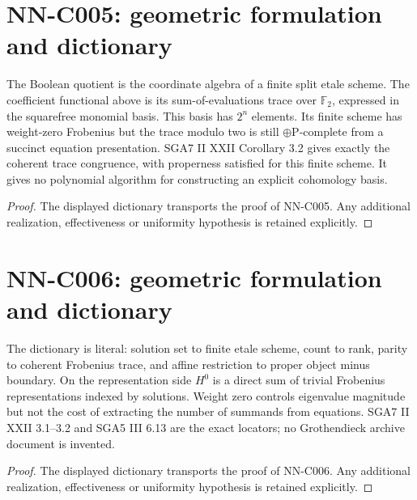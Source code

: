\section{NN-C005: geometric formulation and dictionary}
\begin{geometricstatement}[NN-C005]
The Boolean quotient is the coordinate algebra of a finite split etale scheme. The coefficient functional above is its sum-of-evaluations trace over $\mathbb F_2$, expressed in the squarefree monomial basis. This basis has $2^n$ elements. Its finite scheme has weight-zero Frobenius but the trace modulo two is still $\oplus\mathrm P$-complete from a succinct equation presentation. SGA7 II XXII Corollary 3.2 gives exactly the coherent trace congruence, with properness satisfied for this finite scheme. It gives no polynomial algorithm for constructing an explicit cohomology basis.
\end{geometricstatement}
\begin{proof} The displayed dictionary transports the proof of NN-C005. Any additional realization, effectiveness or uniformity hypothesis is retained explicitly.\end{proof}


\section{NN-C006: geometric formulation and dictionary}
\begin{geometricstatement}[NN-C006]
The dictionary is literal: solution set to finite etale scheme, count to rank, parity to coherent Frobenius trace, and affine restriction to proper object minus boundary. On the representation side $H^0$ is a direct sum of trivial Frobenius representations indexed by solutions. Weight zero controls eigenvalue magnitude but not the cost of extracting the number of summands from equations. SGA7 II XXII 3.1--3.2 and SGA5 III 6.13 are the exact locators; no Grothendieck archive document is invented.
\end{geometricstatement}
\begin{proof} The displayed dictionary transports the proof of NN-C006. Any additional realization, effectiveness or uniformity hypothesis is retained explicitly.\end{proof}


